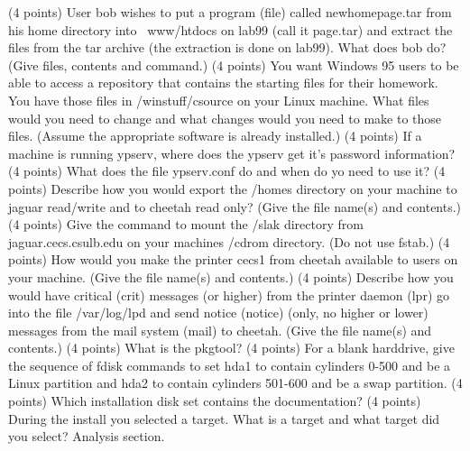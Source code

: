 (4 points)
User {\ltt{}bob} wishes to put a program (file) called 
{\ltt{}newhomepage.tar} from his home directory into {\ltt{}~www/htdocs}
on {\ltt{}lab99} (call it {\ltt{}page.tar}) and extract the files from the tar
archive (the extraction is done on {\ltt{}lab99}).
What does {\ltt{}bob} do? (Give files, contents and command.)
\vskip 2.0in
\ques
(4 points)
You want Windows 95 users to be able to access a repository
that contains the starting files for their homework.
You have those files in {\ltt{}/winstuff/csource}
on your Linux machine.
What files would you need to change and what
changes would you need to make to those files.
(Assume the appropriate software is already installed.)
\vskip 1.3in
\vfill\eject
\ques
(4 points)
If a machine is running {\ltt{}ypserv}, where does the 
{\ltt{}ypserv} get it's password information?
\vskip 1.4in
\ques
(4 points)
What does the file {\ltt{}ypserv.conf} do and when
do yo need to use it?
\vskip 1.4in
\ques
(4 points)
Describe how you would
export the {\ltt{}/homes} directory on your machine to
jaguar read/write
and to cheetah read only?
(Give the file name(s) and contents.)
\vskip 1.2in
\ques
(4 points)
Give the command to mount
the {\ltt{}/slak} directory from {\ltt{}jaguar.cecs.csulb.edu}
on your machines {\ltt{}/cdrom} directory.
(Do not use {\ltt{}fstab}.)
\vskip 1.2in
\ques
(4 points)
How would you make the printer {\ltt{}cecs1} from
{\ltt{}cheetah} available to users on your machine.
(Give the file name(s) and contents.)
\vskip 1.0in
\vfill\eject
\ques
(4 points)
Describe how you would have
critical ({\ltt{}crit}) messages (or higher) from the printer daemon 
({\ltt{}lpr})
go into the file {\ltt{}/var/log/lpd}
and
send notice ({\ltt{}notice}) (only, no higher or lower)
messages from the mail system ({\ltt{}mail}) to {\ltt{}cheetah}.
(Give the file name(s) and contents.)
\vskip 1.5in
\ques
(4 points)
What is the {\ltt{}pkgtool}?
\vskip 1.3in
\ques
(4 points)
For a blank harddrive,
give the sequence of {\ltt{}fdisk} commands to
set {\ltt{}hda1} to contain cylinders 0-500
and be a Linux partition
and {\ltt{}hda2} to contain cylinders 501-600
and be a swap partition.
\vskip 3.0in
\ques
(4 points)
Which installation disk set contains the documentation?
\vskip 0.5in
\ques
(4 points)
During the install you selected a target.
What is a target and
what target did you select?
\vskip 0.5in
\vfill\eject
Analysis section. 

